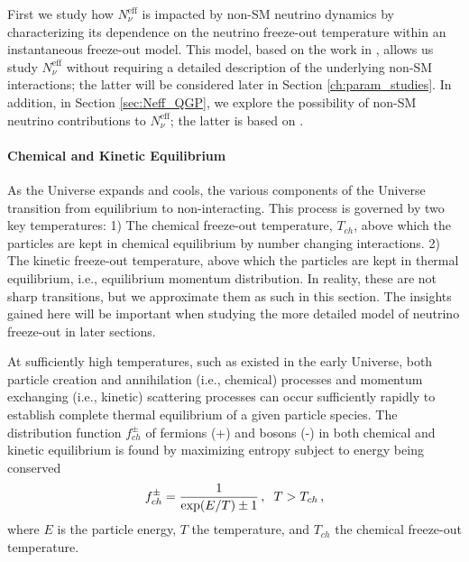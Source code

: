 First we study how $N^{\text{eff}}_{\nu}$ is impacted by non-SM neutrino dynamics by characterizing its dependence on the neutrino freeze-out temperature within an instantaneous freeze-out model.  This model, based on the work in \cite{Birrell:2013gpa,Birrell:2012gg}, allows us study $N^{\text{eff}}_{\nu}$ without  requiring a detailed description of the underlying  non-SM interactions; the latter will be considered later in Section \ref{ch:param_studies}.   In addition, in Section  \ref{sec:Neff_QGP}, we explore the possibility of non-SM neutrino contributions to $N^{\text{eff}}_\nu$; the latter is based on \cite{Birrell:2014cja}.






\paragraph{Chemical and Kinetic Equilibrium }\label{EVEq}

As the Universe expands and cools, the various components of the Universe transition  from equilibrium to non-interacting. This process is governed by two key temperatures: 1) The chemical freeze-out temperature, $T_{ch}$, above which the particles are kept in chemical  equilibrium by number changing interactions. 2) The  kinetic freeze-out temperature, above which the particles are kept in thermal equilibrium, i.e., equilibrium momentum distribution.  In reality, these are not sharp transitions, but we approximate them as such in this section.  The insights gained here will be important when studying the more detailed model of neutrino freeze-out in later sections.



At sufficiently high temperatures, such as existed in the early Universe, both particle creation and annihilation (i.e., chemical) processes and momentum exchanging (i.e., kinetic) scattering processes can occur sufficiently rapidly to establish complete thermal equilibrium of a given particle species. The  distribution function $f_{ch}^\pm$ of  fermions (+) and bosons (-) in both chemical and kinetic equilibrium is found by maximizing entropy subject to energy being conserved
\begin{equation}\label{ch_eq}
f_{ch}^\pm=\frac{1}{\exp(E/T)\pm 1}\,, \hspace{2mm} T>T_{ch}\,,
\end{equation}
where $E$ is the particle energy, $T$ the temperature, and $T_{ch}$ the chemical freeze-out temperature. 



